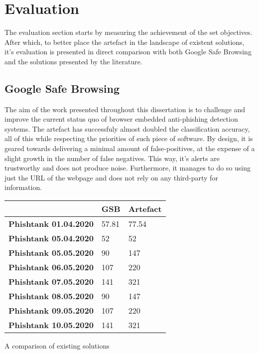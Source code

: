 \chapter{Evaluation}
The evaluation section starts by measuring the achievement of the set objectives. After which, to better place the artefact in the landscape of existent solutions, it's evaluation is presented in direct comparison with both Google Safe Browsing and the solutions presented by the literature.

\section{Google Safe Browsing}
The aim of the work presented throughout this dissertation is to challenge and improve the current status quo of browser embedded anti-phishing detection systems. The artefact has successfuly almost doubled the classification accuracy, all of this while respecting the priorities of such piece of software. By design, it is geared towards delivering a minimal amount of false-positives, at the expense of a slight growth in the number of false negatives. This way, it's alerts are trustworthy and does not produce noise. Furthermore, it manages to do so using just the URL of the webpage and does not rely on any third-party for information.

\begin{singlespace}
    \small
    \begin{center}
        \label{tab:ARTEFACT_VS_GSB}
        \begin{tabular}{ | m{14em} | m{5em} | m{5em} |}
            \hline
                                          & \textbf{GSB} & \textbf{Artefact} \\
            \hline
            \textbf{Phishtank 01.04.2020} & 57.81        & 77.54             \\
            \hline
            \textbf{Phishtank 05.04.2020} & 52           & 52                \\
            \hline\hline
            \textbf{Phishtank 05.05.2020} & 90           & 147               \\
            \hline
            \textbf{Phishtank 06.05.2020} & 107          & 220               \\
            \hline
            \textbf{Phishtank 07.05.2020} & 141          & 321               \\
            \hline
            \textbf{Phishtank 08.05.2020} & 90           & 147               \\
            \hline
            \textbf{Phishtank 09.05.2020} & 107          & 220               \\
            \hline
            \textbf{Phishtank 10.05.2020} & 141          & 321               \\
            \hline
        \end{tabular}
        \captionsetup{type=table}\caption{A comparison of existing solutions \citep{INTELLIGENT_PHISHING_ANFIS}}
    \end{center}
\end{singlespace}

